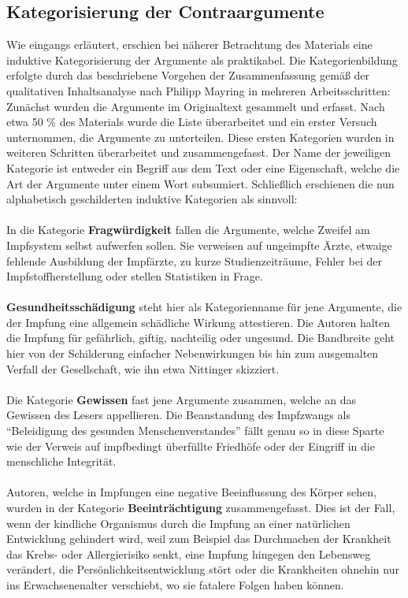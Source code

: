 \documentclass[
    a4paper,
    12pt,
    hyphens,
    chapterprefix=true,
    headheight=33pt,
    footheight=29pt,
    headings=optiontohead, %
]{scrartcl}
\begin{document}
\subsection{Kategorisierung der Contraargumente}
Wie eingangs erläutert, erschien bei näherer Betrachtung des Materials eine induktive Kategorisierung der Argumente als praktikabel. Die Kategorienbildung erfolgte durch das beschriebene Vorgehen der Zusammenfassung gemäß der qualitativen Inhaltsanalyse nach  Philipp Mayring in mehreren Arbeitsschritten: Zunächst wurden die Argumente im Originaltext gesammelt und erfasst. Nach etwa 50 \% des Materials wurde die Liste überarbeitet und ein erster Versuch unternommen, die Argumente zu unterteilen. Diese ersten Kategorien wurden in weiteren Schritten überarbeitet und zusammengefasst. Der Name der jeweiligen Kategorie ist entweder ein Begriff aus dem Text oder eine Eigenschaft, welche die Art der Argumente unter einem Wort subsumiert. Schließlich erschienen die nun alphabetisch geschilderten induktive Kategorien als sinnvoll:\\
\\
In die Kategorie \textbf{Fragwürdigkeit} fallen die Argumente, welche Zweifel am Impfsystem selbst aufwerfen sollen. Sie verweisen auf ungeimpfte Ärzte, etwaige fehlende Ausbildung der Impfärzte, zu kurze Studienzeiträume, Fehler bei der Impfstoffherstellung oder stellen Statistiken in Frage.\\
\\
\textbf{Gesundheitsschädigung} steht hier als Kategorienname für jene Argumente, die der Impfung eine allgemein schädliche Wirkung attestieren. Die Autoren halten die Impfung für gefährlich, giftig, nachteilig oder ungesund. Die Bandbreite geht hier von der Schilderung einfacher Nebenwirkungen bis hin zum ausgemalten Verfall der Gesellschaft, wie ihn etwa Nittinger skizziert.\\
\\
Die Kategorie \textbf{Gewissen} fast jene Argumente zusammen, welche an das Gewissen des Lesers appellieren. Die Beanstandung des Impfzwangs als "`Beleidigung des gesunden Menschenverstandes"' fällt genau so in diese Sparte wie der Verweis auf impfbedingt überfüllte Friedhöfe oder der Eingriff in die menschliche Integrität.\\
\\
Autoren, welche in Impfungen eine negative Beeinflussung des Körper sehen, wurden in der Kategorie \textbf{Beeinträchtigung} zusammengefasst. Dies ist der Fall, wenn der kindliche Organismus durch die Impfung an einer natürlichen Entwicklung gehindert wird, weil zum Beispiel das Durchmachen der Krankheit das Krebs- oder Allergierisiko senkt, eine Impfung hingegen den Lebensweg verändert, die Persönlichkeitsentwicklung stört oder die Krankheiten ohnehin nur ins Erwachsenenalter verschiebt, wo sie fatalere Folgen haben können.\\
\end{document}
